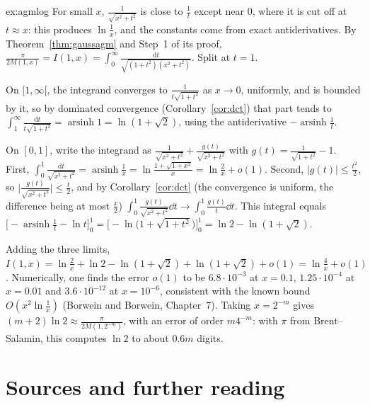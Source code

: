 \begin{solution}{ex:agmlog}
\idea For small $x$, $\frac1{\sqrt{x^2+t^2}}$ is close to $\frac1t$ except near $0$, where it is cut off at $t\approx x$: this produces $\ln\frac1x$, and the constants come from
exact antiderivatives.
\writeup By Theorem~\ref{thm:gaussagm} and Step~1 of its proof, $\frac\pi{2M(1,x)}=I(1,x)=\int_0^\infty\frac{\mathrm dt}{\sqrt{(1+t^2)(x^2+t^2)}}$. Split at $t=1$.

On $[1,\infty[$, the integrand converges to $\frac1{t\sqrt{1+t^2}}$ as $x\to0$, uniformly, and is bounded by it, so by dominated convergence (Corollary~\ref{cor:dct}) that part tends to
$\int_1^\infty\frac{\mathrm dt}{t\sqrt{1+t^2}}=\operatorname{arsinh}1=\ln(1+\sqrt2)$, using the antiderivative $-\operatorname{arsinh}\frac1t$.

On $[0,1]$, write the integrand as $\frac1{\sqrt{x^2+t^2}}+\frac{g(t)}{\sqrt{x^2+t^2}}$ with $g(t)=\frac1{\sqrt{1+t^2}}-1$. First, $\int_0^1\frac{\mathrm dt}{\sqrt{x^2+t^2}}=\operatorname{arsinh}\frac1x
=\ln\frac{1+\sqrt{1+x^2}}x=\ln\frac2x+o(1)$. Second, $|g(t)|\le\frac{t^2}2$, so $\bigl|\frac{g(t)}{\sqrt{x^2+t^2}}\bigr|\le\frac t2$, and by Corollary~\ref{cor:dct} (the convergence is uniform, the difference being at most $\frac x2$)
$\int_0^1\frac{g(t)}{\sqrt{x^2+t^2}}\dd t\to\int_0^1\frac{g(t)}t\dd t$. This integral equals $\bigl[-\operatorname{arsinh}\frac1t-\ln t\bigr]_0^1=\bigl[-\ln\bigl(1+\sqrt{1+t^2}\bigr)\bigr]_0^1=\ln2-\ln(1+\sqrt2)$.

Adding the three limits, $I(1,x)=\ln\frac2x+\ln2-\ln(1+\sqrt2)+\ln(1+\sqrt2)+o(1)=\ln\frac4x+o(1)$. Numerically, one finds the error $o(1)$ to be $6.8\cdot10^{-3}$ at $x=0.1$, $1.25\cdot10^{-4}$
at $x=0.01$ and $3.6\cdot10^{-12}$ at $x=10^{-6}$, consistent with the known bound $O(x^2\ln\frac1x)$ (Borwein and Borwein, Chapter~7). Taking $x=2^{-m}$ gives $(m+2)\ln2\approx\frac\pi{2M(1,2^{-m})}$, with an error of order $m4^{-m}$: with $\pi$ from Brent--Salamin, this computes $\ln2$ to about $0.6m$ digits.
\end{solution}

\section*{Sources and further reading}

